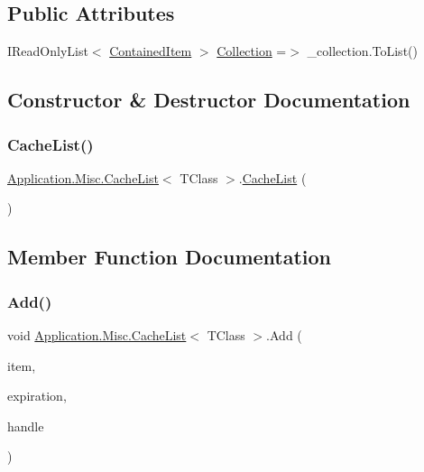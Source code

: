 \subsection*{Public Attributes}
\begin{DoxyCompactItemize}
\item 
I\+Read\+Only\+List$<$ \mbox{\hyperlink{class_application_1_1_misc_1_1_cache_list_1_1_contained_item}{Contained\+Item}} $>$ \mbox{\hyperlink{class_application_1_1_misc_1_1_cache_list_a76ecbd816361d086f756cbe086b505e6}{Collection}} =$>$ \+\_\+collection.\+To\+List()
\end{DoxyCompactItemize}


\subsection{Constructor \& Destructor Documentation}
\mbox{\label{class_application_1_1_misc_1_1_cache_list_aa90b33801fe1b0cba3437908aa470f25}} 
\subsubsection{\texorpdfstring{Cache\+List()}{CacheList()}}
{\footnotesize\ttfamily \mbox{\hyperlink{class_application_1_1_misc_1_1_cache_list}{Application.\+Misc.\+Cache\+List}}$<$ T\+Class $>$.\mbox{\hyperlink{class_application_1_1_misc_1_1_cache_list}{Cache\+List}} (\begin{DoxyParamCaption}{ }\end{DoxyParamCaption})}



\subsection{Member Function Documentation}
\mbox{\label{class_application_1_1_misc_1_1_cache_list_a00141bfa7925e94f1eb396cc00c2d9c1}} 
\subsubsection{\texorpdfstring{Add()}{Add()}}
{\footnotesize\ttfamily void \mbox{\hyperlink{class_application_1_1_misc_1_1_cache_list}{Application.\+Misc.\+Cache\+List}}$<$ T\+Class $>$.Add (\begin{DoxyParamCaption}\item[{T\+Class}]{item,  }\item[{Date\+Time}]{expiration,  }\item[{out \mbox{\hyperlink{interface_application_1_1_misc_1_1_i_cache_handle}{I\+Cache\+Handle}}}]{handle }\end{DoxyParamCaption})}

